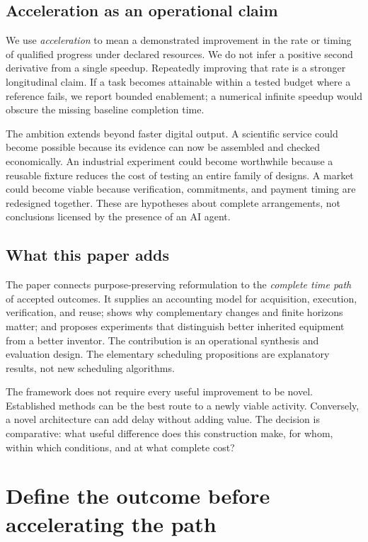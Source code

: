 \documentclass[11pt,letterpaper]{article}
\theoremstyle{remark}\newtheorem{remark}{Remark}[section]
\begin{document}
\subsection{Acceleration as an operational claim}
We use \emph{acceleration} to mean a demonstrated improvement in the rate or timing of qualified progress under declared resources.
We do not infer a positive second derivative from a single speedup.
Repeatedly improving that rate is a stronger longitudinal claim.
If a task becomes attainable within a tested budget where a reference fails, we report bounded enablement; a numerical infinite speedup would obscure the missing baseline completion time.

The ambition extends beyond faster digital output.
A scientific service could become possible because its evidence can now be assembled and checked economically.
An industrial experiment could become worthwhile because a reusable fixture reduces the cost of testing an entire family of designs.
A market could become viable because verification, commitments, and payment timing are redesigned together.
These are hypotheses about complete arrangements, not conclusions licensed by the presence of an AI agent.

\subsection{What this paper adds}
The paper connects purpose-preserving reformulation to the \emph{complete time path} of accepted outcomes.
It supplies an accounting model for acquisition, execution, verification, and reuse; shows why complementary changes and finite horizons matter; and proposes experiments that distinguish better inherited equipment from a better inventor.
The contribution is an operational synthesis and evaluation design.
The elementary scheduling propositions are explanatory results, not new scheduling algorithms.

The framework does not require every useful improvement to be novel.
Established methods can be the best route to a newly viable activity.
Conversely, a novel architecture can add delay without adding value.
The decision is comparative: what useful difference does this construction make, for whom, within which conditions, and at what complete cost?

\section{Define the outcome before accelerating the path}\label{sec:definitions}
\end{document}
